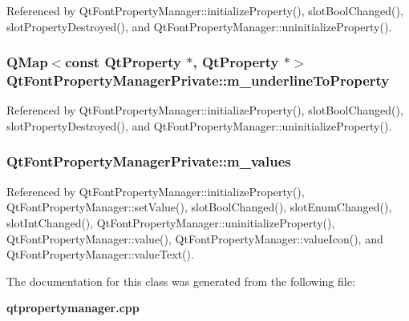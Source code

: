 Referenced by Qt\+Font\+Property\+Manager\+::initialize\+Property(), slot\+Bool\+Changed(), slot\+Property\+Destroyed(), and Qt\+Font\+Property\+Manager\+::uninitialize\+Property().

\subsubsection[{m\+\_\+underline\+To\+Property}]{\setlength{\rightskip}{0pt plus 5cm}Q\+Map$<$const {\bf Qt\+Property} $\ast$, {\bf Qt\+Property} $\ast$$>$ Qt\+Font\+Property\+Manager\+Private\+::m\+\_\+underline\+To\+Property}\label{classQtFontPropertyManagerPrivate_a7e2e4bb5bc533f4c67347bb5d1252eb9}


Referenced by Qt\+Font\+Property\+Manager\+::initialize\+Property(), slot\+Bool\+Changed(), slot\+Property\+Destroyed(), and Qt\+Font\+Property\+Manager\+::uninitialize\+Property().

\subsubsection[{m\+\_\+values}]{ Qt\+Font\+Property\+Manager\+Private\+::m\+\_\+values}\label{classQtFontPropertyManagerPrivate_ade4279556036408ff22f96d3298ece00}


Referenced by Qt\+Font\+Property\+Manager\+::initialize\+Property(), Qt\+Font\+Property\+Manager\+::set\+Value(), slot\+Bool\+Changed(), slot\+Enum\+Changed(), slot\+Int\+Changed(), Qt\+Font\+Property\+Manager\+::uninitialize\+Property(), Qt\+Font\+Property\+Manager\+::value(), Qt\+Font\+Property\+Manager\+::value\+Icon(), and Qt\+Font\+Property\+Manager\+::value\+Text().



The documentation for this class was generated from the following file\+:\begin{DoxyCompactItemize}
\item 
{\bf qtpropertymanager.\+cpp}\end{DoxyCompactItemize}
